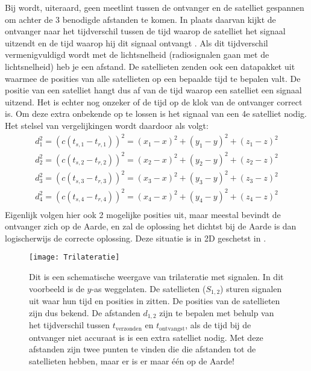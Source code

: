 Bij \gps wordt, uiteraard, geen meetlint tussen de ontvanger en de satelliet
gespannen om achter de 3 benodigde afstanden te komen. In plaats daarvan kijkt de ontvanger
naar het tijdverschil tussen de tijd waarop de \gps satelliet het
signaal uitzendt en de tijd waarop hij dit signaal ontvangt
\cite{blewitt1997gps}. Als dit tijdverschil vermenigvuldigd wordt met de
lichtsnelheid (radiosignalen gaan met de lichtsnelheid) heb je een
afstand. De \gps satellieten zenden ook een datapakket uit waarmee de
posities van alle \gps satellieten op een bepaalde tijd te bepalen valt.
De positie van een \gps satelliet hangt dus af van de tijd waarop een
satelliet een signaal uitzend. Het is echter nog onzeker of de tijd op de klok van de
ontvanger correct is. Om deze extra onbekende op te lossen is het
signaal van een 4e satelliet nodig. Het stelsel van vergelijkingen wordt daardoor als volgt:
\begin{equation}
    \label{eq:gps_stelsel}
    \begin{array}{rcl}
        d_1^2 = (c(t_{s,1}-t_{r,1}))^2 = (x_1-x)^2+(y_1-y)^2+(z_1-z)^2 \\
        d_2^2 = (c(t_{s,2}-t_{r,2}))^2 = (x_2-x)^2+(y_2-y)^2+(z_2-z)^2 \\
        d_3^2 = (c(t_{s,3}-t_{r,3}))^2 = (x_3-x)^2+(y_3-y)^2+(z_3-z)^2 \\
        d_4^2 = (c(t_{s,4}-t_{r,4}))^2 = (x_4-x)^2+(y_4-y)^2+(z_4-z)^2 \\
    \end{array}
\end{equation}
Eigenlijk volgen hier ook 2 mogelijke posities uit, maar meestal bevindt
de ontvanger zich op de Aarde, en zal de oplossing het dichtst bij de
Aarde is dan logischerwijs de correcte oplossing. Deze situatie is in 2D geschetst in
.

\begin{figure}
    \centering
    \texttt{[image: Trilateratie]}
    \caption{Dit is een schematische weergave van trilateratie met \gps
             signalen. In dit voorbeeld is de $y$-as weggelaten. De
             satellieten ($S_{1,2}$) sturen signalen uit waar hun tijd
             en posities in zitten. De posities van de satellieten zijn
             dus bekend. De afstanden $d_{1,2}$ zijn te bepalen met
             behulp van het tijdverschil tussen $t_\textrm{verzonden}$ en
             $t_\textrm{ontvangst}$, als de tijd bij de ontvanger niet accuraat
             is is een extra satelliet nodig. Met deze afstanden zijn
             twee punten te vinden die die afstanden tot de satellieten
             hebben, maar er is er maar één op de Aarde!}
    \label{fig:Trilateratie}
\end{figure}


